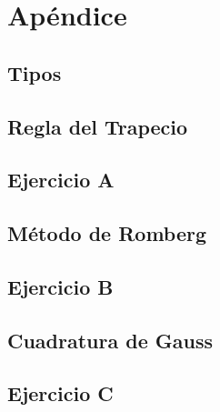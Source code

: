 \section{Apéndice} 

\subsection{Tipos}\label{code:types}


\newpage

\subsection{Regla del Trapecio}\label{code:trapezium}


\newpage

\subsection{Ejercicio A}\label{code:ex1}


\newpage

\subsection{Método de Romberg}\label{code:romberg}


\newpage

\subsection{Ejercicio B}\label{code:ex2}


\newpage

\subsection{Cuadratura de Gauss}\label{code:gauss_quad}


\newpage


\subsection{Ejercicio C}\label{code:ex3}


\newpage
